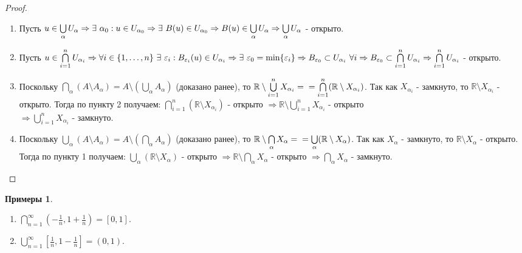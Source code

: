 \documentclass[a4paper, 12pt]{article}
\newcommand{\R}{\mathbb{R}}
\renewcommand{\epsilon}{\varepsilon}
\newcommand\tab[1][.5cm]{\hspace*{#1}}
\theoremstyle{definition}
\newtheorem*{examples}{Примеры}
\begin{document}
        \begin{proof} \tab
            \begin{enumerate}
                \item Пусть $u\in \bigcup\limits_{\alpha} U_{\alpha} \Rightarrow \exists\ \alpha_0: u\in U_{\alpha_0}\Rightarrow \exists\ B(u)\in U_{\alpha_0}\Rightarrow B(u)\in \bigcup\limits_{\alpha} U_{\alpha}\\
                \Rightarrow \bigcup\limits_{\alpha} U_{\alpha}$ - открыто.
                \item Пусть $u\in \bigcap\limits_{i=1}^n U_{\alpha_i} \Rightarrow \forall i\in \{1,\dots, n\}\ \exists\ \epsilon_i: B_{\epsilon_i}(u)\in U_{\alpha_i}\Rightarrow \exists\ \epsilon_0 = \min\{\epsilon_{i}\}\\
                \Rightarrow B_{\epsilon_{0}}\subset U_{\alpha_i}\ \forall i \Rightarrow B_{\epsilon_{0}}\subset \bigcap\limits_{i=1}^n U_{\alpha_i} \Rightarrow \bigcap\limits_{i=1}^n U_{\alpha_i}$ - открыто.
                \item Поскольку $\bigcap\limits_{\alpha}(A\setminus A_{\alpha}) = A\setminus (\bigcup\limits_{\alpha}A_{\alpha})$ (доказано ранее), то $\R \setminus \bigcup\limits_{i=1}^n X_{\alpha_i}=\\
                =\bigcap\limits_{i=1}^n(\R \setminus X_{\alpha_i})$. Так как $X_{\alpha_i}$ - замкнуто, то $\R \setminus X_{\alpha_i}$ - открыто. Тогда по пункту 2 получаем: $\bigcap\limits_{i=1}^n(\R \setminus X_{\alpha_i})$ - открыто $\Rightarrow \R \setminus \bigcup\limits_{i=1}^n X_{\alpha_i}$ - открыто \\
                $\Rightarrow \bigcup\limits_{i=1}^n X_{\alpha_i}$ - замкнуто.
                \item Поскольку $\bigcup\limits_{\alpha}(A\setminus A_{\alpha}) = A\setminus (\bigcap\limits_{\alpha}A_{\alpha})$ (доказано ранее), то $\R \setminus \bigcap\limits_{\alpha} X_{\alpha}=\\
                =\bigcup\limits_{\alpha}(\R \setminus X_{\alpha})$. Так как $X_{\alpha}$ - замкнуто, то $\R \setminus X_{\alpha}$ - открыто. Тогда по пункту 1 получаем: $\bigcup\limits_{\alpha}(\R \setminus X_{\alpha})$ - открыто $\Rightarrow \R \setminus \bigcap\limits_{\alpha} X_{\alpha}$ - открыто $\Rightarrow \bigcap\limits_{\alpha}X_{\alpha}$ - замкнуто.
            \end{enumerate}
        \end{proof} 
        \begin{examples} \tab
            \begin{enumerate}
                \item $\bigcap\limits_{n=1}^{\infty}(-\frac{1}{n}, 1+\frac{1}{n})=[0,1]$.
                \item $\bigcup\limits_{n=1}^{\infty}[\frac{1}{n}, 1-\frac{1}{n}]=(0,1)$.
            \end{enumerate}
        \end{examples}
\end{document}
